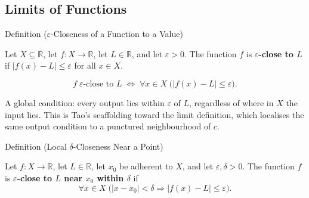 
\subsection*{Limits of Functions}
\label{sec:limits-of-functions}


\begin{definitionbox}{Definition ($\varepsilon$-Closeness of a Function to a Value)}
\begin{definition}
\label{def:eps-close-function}
Let $X \subseteq \mathbb{R}$, let $f : X \to \mathbb{R}$, let
$L \in \mathbb{R}$, and let $\varepsilon > 0$. The function $f$ is
\textbf{$\varepsilon$-close to $L$} if $|f(x)-L|\leq\varepsilon$ for
all $x\in X$.
\end{definition}
\end{definitionbox}

\begin{remark*}
\[
  f \;\varepsilon\text{-close to } L
  \;\iff\;
  \forall x \in X\;\bigl(|f(x)-L|\leq\varepsilon\bigr).
\]
\end{remark*}

\begin{remark*}[Interpretation]
A global condition: every output lies within $\varepsilon$ of $L$,
regardless of where in $X$ the input lies. This is Tao's scaffolding
toward the limit definition, which localises the same output
condition to a punctured neighbourhood of $c$.
\end{remark*}

\NoLocalDependencies

\begin{definitionbox}{Definition (Local $\delta$-Closeness Near a Point)}
\begin{definition}
\label{def:delta-close-function}
Let $f : X \to \mathbb{R}$, let $L \in \mathbb{R}$, let $x_0$ be
adherent to $X$, and let $\varepsilon, \delta > 0$. The function $f$
is \textbf{$\varepsilon$-close to $L$ near $x_0$ within $\delta$} if
\[
  \forall x \in X\;\bigl(|x-x_0|<\delta\Rightarrow |f(x)-L|\leq\varepsilon\bigr).
\]
\end{definition}
\end{definitionbox}

